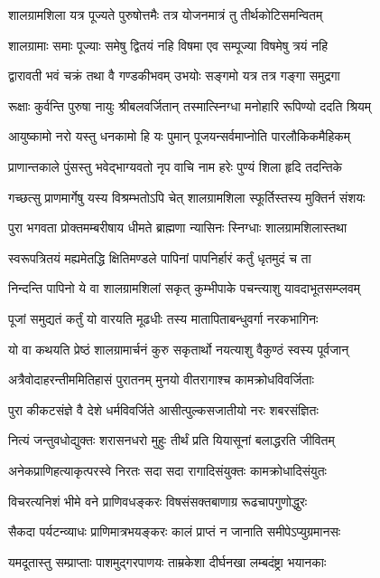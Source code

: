 \twolineshloka
{शालग्रामशिला यत्र पूज्यते पुरुषोत्तमैः}
{तत्र योजनमात्रं तु तीर्थकोटिसमन्वितम्}%

\twolineshloka
{शालग्रामाः समाः पूज्याः समेषु द्वितयं नहि}
{विषमा एव सम्पूज्या विषमेषु त्रयं नहि}%

\twolineshloka
{द्वारावती भवं चक्रं तथा वै गण्डकीभवम्}
{उभयोः सङ्गमो यत्र तत्र गङ्गा समुद्रगा}%

\twolineshloka
{रूक्षाः कुर्वन्ति पुरुषा नायुः श्रीबलवर्जितान्}
{तस्मात्स्निग्धा मनोहारि रूपिण्यो ददति श्रियम्}%

\twolineshloka
{आयुष्कामो नरो यस्तु धनकामो हि यः पुमान्}
{पूजयन्सर्वमाप्नोति पारलौकिकमैहिकम्}%

\twolineshloka
{प्राणान्तकाले पुंसस्तु भवेद्भाग्यवतो नृप}
{वाचि नाम हरेः पुण्यं शिला हृदि तदन्तिके}%

\twolineshloka
{गच्छत्सु प्राणमार्गेषु यस्य विश्रम्भतोऽपि चेत्}
{शालग्रामशिला स्फूर्तिस्तस्य मुक्तिर्न संशयः}%

\twolineshloka
{पुरा भगवता प्रोक्तमम्बरीषाय धीमते}
{ब्राह्मणा न्यासिनः स्निग्धाः शालग्रामशिलास्तथा}%

\twolineshloka
{स्वरूपत्रितयं मह्यमेतद्धि क्षितिमण्डले}
{पापिनां पापनिर्हारं कर्तुं धृतमुदं च ता}%

\twolineshloka
{निन्दन्ति पापिनो ये वा शालग्रामशिलां सकृत्}
{कुम्भीपाके पचन्त्याशु यावदाभूतसम्प्लवम्}%

\twolineshloka
{पूजां समुद्यतं कर्तुं यो वारयति मूढधीः}
{तस्य मातापिताबन्धुवर्गा नरकभागिनः}%

\twolineshloka
{यो वा कथयति प्रेष्ठं शालग्रामार्चनं कुरु}
{सकृतार्थो नयत्याशु वैकुण्ठं स्वस्य पूर्वजान्}%

\twolineshloka
{अत्रैवोदाहरन्तीममितिहासं पुरातनम्}
{मुनयो वीतरागाश्च कामक्रोधविवर्जिताः}%

\twolineshloka
{पुरा कीकटसंज्ञे वै देशे धर्मविवर्जिते}
{आसीत्पुल्कसजातीयो नरः शबरसंज्ञितः}%

\twolineshloka
{नित्यं जन्तुवधोद्युक्तः शरासनधरो मुहुः}
{तीर्थं प्रति यियासूनां बलाद्धरति जीवितम्}%

\twolineshloka
{अनेकप्राणिहत्याकृत्परस्वे निरतः सदा}
{सदा रागादिसंयुक्तः कामक्रोधादिसंयुतः}%

\twolineshloka
{विचरत्यनिशं भीमे वने प्राणिवधङ्करः}
{विषसंसक्तबाणाग्र रूढचापगुणोद्धुरः}%

\twolineshloka
{सैकदा पर्यटन्व्याधः प्राणिमात्रभयङ्करः}
{कालं प्राप्तं न जानाति समीपेऽप्युग्रमानसः}%

\twolineshloka
{यमदूतास्तु सम्प्राप्ताः पाशमुद्गरपाणयः}
{ताम्रकेशा दीर्घनखा लम्बदंष्ट्रा भयानकाः}%

